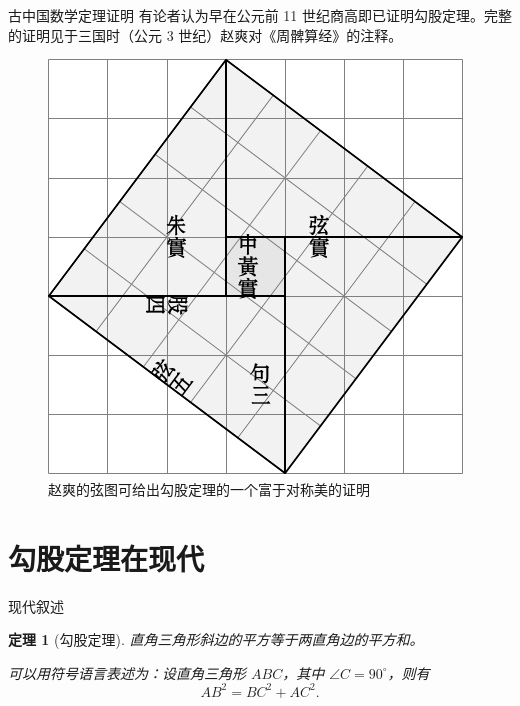 \documentclass[no-math,xcolor=table]{beamer}
\newtheorem{thm}{定理}
\begin{document}
\begin{frame}{古中国数学}{定理证明}
有论者认为早在公元前 11 世纪商高即已证明勾股定理\cite{quanjing}。完整的证明见于三国时（公元 3 世纪）赵爽对《周髀算经》的注释。
\pause
\begin{figure}
\centering
\includegraphics[height=0.4\textheight]{xiantu.pdf}
\caption{赵爽的弦图可给出勾股定理的一个富于对称美的证明}
\end{figure}
\end{frame}

\section{勾股定理在现代}

\begin{frame}{现代叙述}
\begin{thm}[勾股定理]
直角三角形斜边的平方等于两直角边的平方和。\pause

可以用符号语言表述为：设直角三角形 $ABC$，其中 $\angle C=90^\circ$，则有
\begin{equation}\label{eq:gougu}
AB^2 = BC^2 + AC^2.
\end{equation}
\begin{center}
\end{center}
\end{thm}
\end{frame}
\end{document}
